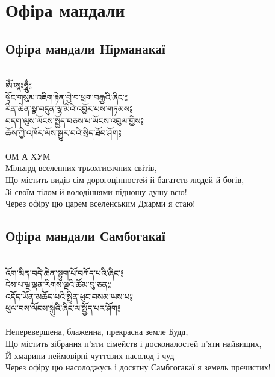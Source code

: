 \section{Офіра мандали}

\subsection{Офіра мандали Нірманакаї}
\\
\ti
ཨོཾ་ཨཱཿཧཱུྂ༔ \\
སྟོང་གསུམ་འཇིག་རྟེན་བྱེ་བ་ཕྲག་བརྒྱའི་ཞིང་༔\\
རིན་ཆེན་སྣ་བདུན་ལྷ་མིའི་འབྱོར་པས་གཏམས༔ \\
བདག་ལུས་ལོངས་སྤྱོད་བཅས་པ་ཡོངས་འབུལ་གྱིས༔ \\
ཆོས་ཀྱི་འཁོར་ལོས་སྒྱུར་བའི་སྲིད་ཐོབ་ཤོག༔ \\
\\
\ru
ОМ А ХУМ\\
Мільярд вселенних трьохтисячних світів,\\
Що містить видів сім дорогоцінностей й багатств людей й богів,\\
Зі своїм тілом й володіннями підношу душу всю!\\
Через офіру цю царем вселенським Дхарми я стаю!\\

\subsection{Офіра мандали Самбогакаї}
\\
\ti
འོག་མིན་བདེ་ཆེན་སྟུག་པོ་བཀོད་པའི་ཞིང་༔ \\
ངེས་པ་ལྔ་ལྡན་རིགས་ལྔའི་ཚོམ་བུ་ཅན༔  \\
འདོད་ཡོན་མཆོད་པའི་སྤྲིན་ཕུང་བསམ་ཡས་པ༔ \\
ཕུལ་བས་ལོངས་སྐུའི་ཞིང་ལ་སྤྱོད་པར་ཤོག༔ \\
\\
\ru
Неперевершена, блаженна, прекрасна земле Будд,\\
Що містить зібрання п'яти сімейств і досконалостей п'яти найвищих,\\
Й хмарини неймовірні чуттєвих насолод і чуд ---\\
Через офіру цю насолоджусь і досягну Самбгогакаї я земель пречистих!\\

\newpage
